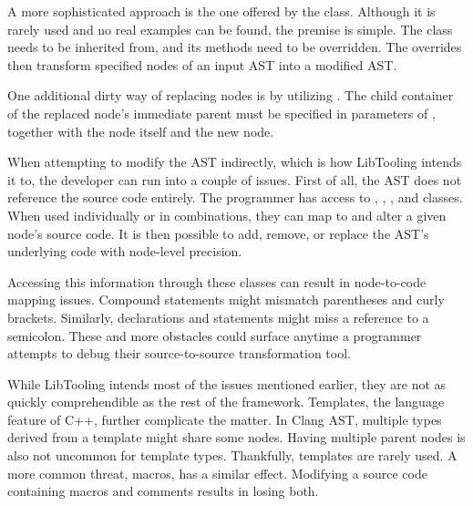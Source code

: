 A more sophisticated approach is the one offered 
by the  class. 
Although it is rarely used and no real examples can be found, 
the premise is simple. 
The  class needs to be inherited from, 
and its  methods need to be overridden. 
The overrides then transform specified nodes of an input AST 
into a modified AST.

One additional dirty way of replacing nodes is by utilizing 
. 
The child container of the replaced node's immediate parent must be 
specified in parameters of , together with 
the node itself and the new node.


When attempting to modify the AST indirectly, which is how LibTooling 
intends it to, the developer can run into a couple of issues. 
First of all, the AST does not reference the source code entirely. 
The programmer has access to , ,
, and  classes. 
When used individually or in combinations, they can map to and alter 
a given node's source code.
It is then possible to add, remove, or replace the AST's underlying 
code with node-level precision.

Accessing this information through these classes can result in 
node-to-code mapping issues. 
Compound statements might mismatch parentheses and curly brackets. 
Similarly, declarations and statements might miss a reference to 
a semicolon. 
These and more obstacles could surface anytime a programmer attempts 
to debug their source-to-source transformation tool. 

While LibTooling intends most of the issues mentioned earlier, 
they are not as quickly comprehendible as the rest of the framework. 
Templates, the language feature of C++, further complicate the matter. 
In Clang AST, multiple types derived from a template might share some nodes. 
Having multiple parent nodes is also not uncommon for template types. 
Thankfully, templates are rarely used. 
A more common threat, macros, has a similar effect. 
Modifying a source code containing macros and comments results in 
losing both.
